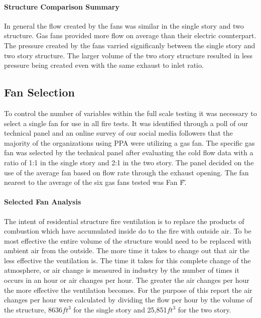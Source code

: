\documentclass{article}
\begin{document}
\paragraph{Structure Comparison Summary} \mbox{}

In general the flow created by the fans was similar in the single story and two structure. Gas fans provided more flow on average than their electric counterpart. The pressure created by the fans varried significanly between the single story and two story structure. The larger volume of the two story structure resulted in less pressure being created even with the same exhaust to inlet ratio. 

\subsection{Fan Selection}

To control the number of variables within the full scale testing it was necessary to select a single fan for use in all fire tests. It was identified through a poll of our technical panel and an online survey of our social media followers that the majority of the organizations using PPA were utilizing a gas fan. The specific gas fan was selected by the technical panel after evaluating the cold flow data with a ratio of 1:1 in the single story and 2:1 in the two story. The panel decided on the use of the average fan based on flow rate through the exhaust opening. The fan nearest to the average of the six gas fans tested was Fan \'F\'. 

\paragraph{Selected Fan Analysis} \mbox{}

The intent of residential structure fire ventilation is to replace the products of combustion which have accumulated inside do to the fire with outside air. To be most effective the entire volume of the structure would need to be replaced with ambient air from the outside. The more time it takes to change out that air the less effective the ventilation is. The time it takes for this complete change of the atmosphere, or air change is measured in industry by the number of times it occurs in an hour or air changes per hour. The greater the air changes per hour the more effective the ventilation becomes. For the purpose of this report the air changes per hour were calculated by dividing the flow per hour by the volume of the structure,  8636$ft^3$ for the single story and 25,851$ft^3$ for the two story. 
\end{document}
